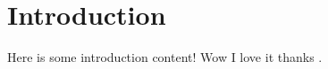 \section{Introduction}
\label{sec:Introduction}

Here is some introduction content! Wow I love it thanks \cite{Bialecki2022Determinants}.